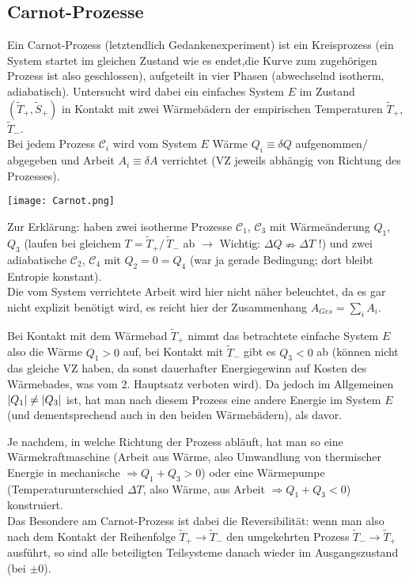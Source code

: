 \documentclass[../KlassMech_main.tex]{subfiles}
\begin{document}
	\subsection{Carnot-Prozesse}
Ein Carnot-Prozess (letztendlich Gedankenexperiment) ist ein Kreisprozess (ein System startet im gleichen Zustand wie es endet,die Kurve zum zugehörigen Prozess ist also geschlossen), aufgeteilt in vier Phasen (abwechselnd isotherm, adiabatisch). Untersucht wird dabei ein einfaches System $E$ im Zustand $(\tilde{T}_+, \tilde{S}_+)$ in Kontakt mit zwei Wärmebädern der empirischen Temperaturen $\tilde{T}_+$, $\tilde{T}_-$.\\
Bei jedem Prozess $\mathcal{C}_i$ wird vom System $E$ Wärme $Q_i \equiv \delta Q$ aufgenommen/ abgegeben und Arbeit $A_i \equiv \delta A$ verrichtet (VZ jeweils abhängig von Richtung des Prozesses).

\begin{center}
\texttt{[image: Carnot.png]}
\label{fig:Carnot}
\end{center}

Zur Erklärung: haben zwei isotherme Prozesse $\mathcal{C}_1$, $\mathcal{C}_3$ mit Wärmeänderung $Q_1$,  $Q_3$ (laufen bei gleichem $T = \tilde{T}_+/\, \tilde{T}_-$ ab $\rightarrow$ Wichtig: $\Delta Q \nRightarrow \Delta T$ !) %
und zwei adiabatische $\mathcal{C}_2$, $\mathcal{C}_4$ mit $Q_2 = 0 = Q_4$ (war ja gerade Bedingung; dort bleibt Entropie konstant).\\
Die vom System verrichtete Arbeit wird hier nicht näher beleuchtet, da es gar nicht explizit benötigt wird, es reicht hier der Zusammenhang $A_{Ges} = \sum \limits_i A_i$.

Bei Kontakt mit dem Wärmebad $\tilde{T}_+$ nimmt das betrachtete einfache System $E$ also die Wärme $Q_1 > 0$ auf, bei Kontakt mit $\tilde{T}_-$ gibt es $Q_3 < 0$ ab (können nicht das gleiche VZ haben, da sonst dauerhafter Energiegewinn auf Kosten des Wärmebades, was vom 2. Hauptsatz verboten wird). Da jedoch im Allgemeinen $\abs{Q_1} \neq \abs{Q_3}$ ist, hat man nach diesem Prozess eine andere Energie im System $E$ (und dementsprechend auch in den beiden Wärmebädern), als davor.

Je nachdem, in welche Richtung der Prozess abläuft, hat man so eine Wärmekraftmaschine (Arbeit aus Wärme, also Umwandlung von thermischer Energie in mechanische $\Rightarrow Q_1 + Q_3 > 0$) oder eine Wärmepumpe (Temperaturunterschied $\Delta T$, also Wärme, aus Arbeit $\Rightarrow Q_1 + Q_3 < 0$) konstruiert.\\
Das Besondere am Carnot-Prozess ist dabei die Reversibilität: wenn man also nach dem Kontakt der Reihenfolge $\tilde{T}_+ \rightarrow \tilde{T}_-$ den umgekehrten Prozess $\tilde{T}_- \rightarrow \tilde{T}_+$ ausführt, so sind alle beteiligten Teilsysteme danach wieder im Ausgangszustand (bei $\pm 0$).
\end{document}
